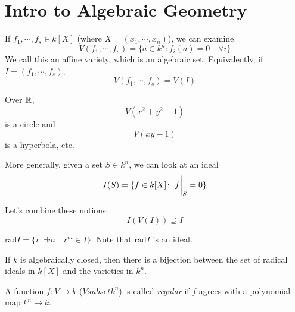 \documentclass[a4paper,twoside,master.tex]{subfiles}
\begin{document}

\section{Intro to Algebraic Geometry}\label{sec:intro_to_algebraic_geometry}


If $ f_1, \cdots, f_s \in k[X] $ (where $ X = (x_1, \cdots, x_n) $), we can examine
\begin{equation}
    V(f_1, \cdots, f_s) = \{a \in k^n \colon f_i(a) = 0 \quad\forall i\}
\end{equation}
We call this an affine variety, which is an algebraic set. Equivalently, if $ I = (f_1, \cdots, f_s) $,
\begin{equation}
    V(f_1, \cdots, f_s) = V(I)
\end{equation}
\begin{ex}
    Over $ \mathbb{R} $,
    \begin{equation}
        V(x^2 + y^2 - 1)
    \end{equation}
    is a circle and
    \begin{equation}
        V(xy - 1)
    \end{equation}
    is a hyperbola, etc.
\end{ex}

More generally, given a set $ S \in k^n $, we can look at an ideal
\begin{equation}
    I(S) = \{f \in k[X] \colon \eval{f}_{S} = 0\}
\end{equation}

Let's combine these notions:
\begin{equation}
    I(V(I)) \supseteq I
\end{equation}

\begin{definition}
    $ \text{rad} I = \{r\colon \exists m\quad r^m \in I\} $. Note that $ \text{rad} I $ is an ideal.
\end{definition}

\begin{theorem}
    If $ k $ is algebraically closed, then there is a bijection between the set of radical ideals in $ k[X] $ and the varieties in $ k^n $.
\end{theorem}

\begin{definition}
    A function $ f\colon V \to k $ ($ V subset k^n $) is called \textit{regular} if $ f $ agrees with a polynomial map $ k^n \to k $.
\end{definition}
\end{document}
